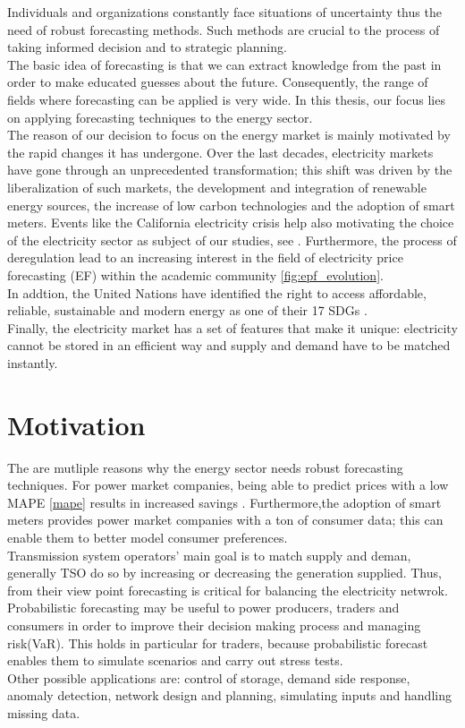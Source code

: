 Individuals and organizations constantly face situations of uncertainty thus the need of robust forecasting methods. Such methods are crucial to the process of taking informed decision and to strategic planning.
\\
The basic idea of forecasting is that we can extract knowledge from the past in order to make educated guesses about the future. Consequently, the range of fields where forecasting can be applied is very wide.
In this thesis, our focus lies on applying forecasting techniques to the energy sector. 
\\
The reason of our decision to focus on the energy market is mainly motivated by the rapid changes it has undergone. %
Over the last decades, electricity markets have gone through an unprecedented transformation; this shift was driven by the liberalization of such markets, the development and integration of renewable energy sources, the  increase of low carbon technologies and the adoption of smart meters. Events like the California electricity crisis help also motivating the choice of the electricity sector as subject of our studies, see \cite{california}.
Furthermore, the process of deregulation lead to an increasing interest in the field of electricity price forecasting (EF) within the academic community \ref{fig:epf_evolution}.
\\
In addtion, the United Nations have identified the right to access affordable, reliable, sustainable and modern energy as one of their 17 SDGs \cite{un_sdgs}.
\\
Finally, the electricity market has a set of features that make it unique: electricity cannot be stored in an efficient way and supply and demand have to be matched instantly.
\\
\section{Motivation}
The are mutliple reasons why the energy sector needs robust forecasting techniques.
For power market companies, being able to predict prices with a low MAPE \ref{mape} results in increased savings \cite{savings}. Furthermore,the adoption of smart meters provides power market companies with a ton of consumer data; this can enable them to better model consumer preferences.
\\
Transmission system operators' main goal is to match supply and deman, generally TSO do so by increasing or decreasing the generation supplied. Thus, from their view point forecasting is critical for balancing the electricity netwrok.
\\
Probabilistic forecasting may be useful to power producers, traders and consumers in order to improve their decision making process and managing risk(VaR). This holds in particular for traders, because probabilistic forecast enables them to simulate scenarios and carry out stress tests.
\\
Other possible applications are: control of storage, demand side response, anomaly detection, network design and planning, simulating inputs and handling missing data.
\\
